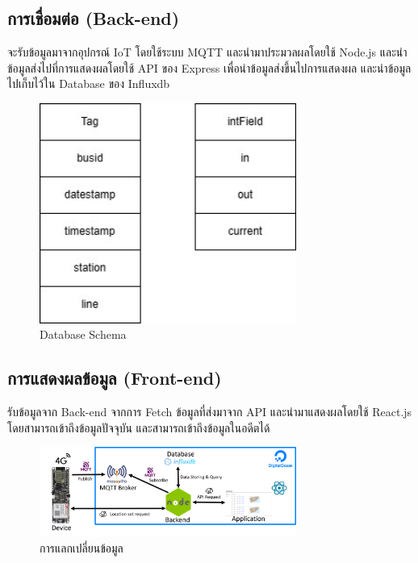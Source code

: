 \subsection{การเชื่อมต่อ (Back-end)}
จะรับข้อมูลมาจากอุปกรณ์ IoT โดยใช้ระบบ MQTT และนำมาประมวลผลโดยใช้ Node.js และนำข้อมูลส่งไปที่การแสดงผลโดยใช้ API ของ Express เพื่อนำข้อมูลส่งขึ้นไปการแสดงผล และนำข้อมูลไปเก็บไว้ใน Database ของ Influxdb

\begin{figure}[h!]
    \begin{center}
      \includegraphics[width=0.75\textwidth]{dbschema.jpg}
    \end{center}
    \caption[Poem]{Database Schema}
    \label{fig:dbschema}
  \end{figure}

\subsection{การแสดงผลข้อมูล (Front-end)}
รับข้อมูลจาก Back-end จากการ Fetch ข้อมูลที่ส่งมาจาก API และนำมาแสดงผลโดยใช้ React.js โดยสามารถเข้าถึงข้อมูลปัจจุบัน และสามารถเข้าถึงข้อมูลในอดีตได้

\begin{figure}[h!]
    \begin{center}
      \includegraphics[width=0.75\textwidth]{exchange-data.png}
    \end{center}
    \caption{การแลกเปลี่ยนข้อมูล}
    \label{fig:exchangedata}
  \end{figure}

